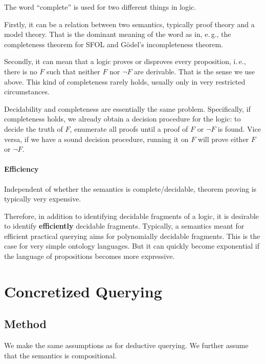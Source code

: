 \begin{remark}
The word \enquote{complete} is used for two different things in logic.

Firstly, it can be a relation between two semantics, typically proof theory and a model theory.
That is the dominant meaning of the word as in, e.\,g., the completeness theorem for SFOL and Gödel's incompleteness theorem.

Secondly, it can mean that a logic proves or disproves every proposition, i.\,e., there is no $F$ such that neither $F$ nor $\neg F$ are derivable.
That is the sense we use above.
This kind of completeness rarely holds, usually only in very restricted circumstances.
\end{remark}

Decidability and completeness are essentially the same problem.
Specifically, if completeness holds, we already obtain a decision procedure for the logic: to decide the truth of $F$, enumerate all proofs until a proof of $F$ or $\neg F$ is found.
Vice versa, if we have a sound decision procedure, running it on $F$ will prove either $F$ or $\neg F$.

\paragraph{Efficiency}
Independent of whether the semantics is complete/decidable, theorem proving is typically very expensive.

Therefore, in addition to identifying decidable fragments of a logic, it is desirable to identify \textbf{efficiently} decidable fragments.
Typically, a semantics meant for efficient practical querying aims for polynomially decidable fragments.
This is the case for very simple ontology languages.
But it can quickly become exponential if the language of propositions becomes more expressive.

\section{Concretized Querying}\label{sec:bolquery:conc}

\subsection{Method}

We make the same assumptions as for deductive querying.
We further assume that the semantics is compositional.

